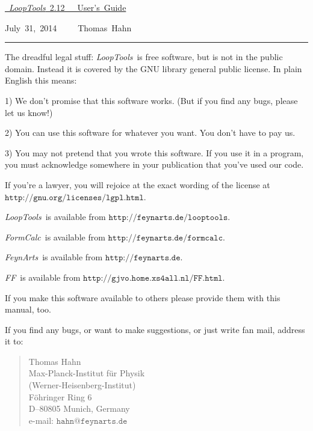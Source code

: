 \documentclass[twoside,12pt]{report}
\def\FA{\textit{FeynArts}}
\def\FC{\textit{FormCalc}}
\def\FF{\textit{FF}}
\def\LT{\textit{LoopTools}}
\def\Code#1{\ensuremath{\texttt{#1}}}
\begin{document}
\thispagestyle{empty}

\vspace*{.7\textheight}

\hfill\hbox{\underline{%
\vrule width 0pt height 0pt depth 2ex%
\Huge \LT~2.12~~~User's Guide}}

\vspace*{1ex}

\hfill\hbox{July 31, 2014~~~~~Thomas Hahn}

\clearpage

\vspace*{.5\textheight}
\vfill

\hrule

\medskip

\begin{scriptsize}
The dreadful legal stuff:
\LT\ is free software, but is not in the public domain.
Instead it is covered by the GNU library general public license.
In plain English this means:

1) We don't promise that this software works.   
(But if you find any bugs, please let us know!)

2) You can use this software for whatever you want.
You don't have to pay us.

3) You may not pretend that you wrote this software.
If you use it in a program, you must acknowledge
somewhere in your publication that you've used  
our code.

If you're a lawyer, you will rejoice at the exact wording of the license 
at \Code{http://gnu.org/licenses/lgpl.html}.

\LT\ is available from \Code{http://feynarts.de/looptools}.

\FC\ is available from \Code{http://feynarts.de/formcalc}.

\FA\ is available from \Code{http://feynarts.de}.

\FF\ is available from \Code{http://gjvo.home.xs4all.nl/FF.html}.

If you make this software available to others please provide them with
this manual, too.

If you find any bugs, or want to make suggestions, or just write fan mail,
address it to:
\vspace*{-2ex}
\begin{quote}
Thomas Hahn \\
Max-Planck-Institut f\"ur Physik \\
(Werner-Heisenberg-Institut) \\
F\"ohringer Ring 6 \\
D--80805 Munich, Germany \\
e-mail: \Code{hahn@feynarts.de}
\end{quote}
\end{scriptsize}
\end{document}
